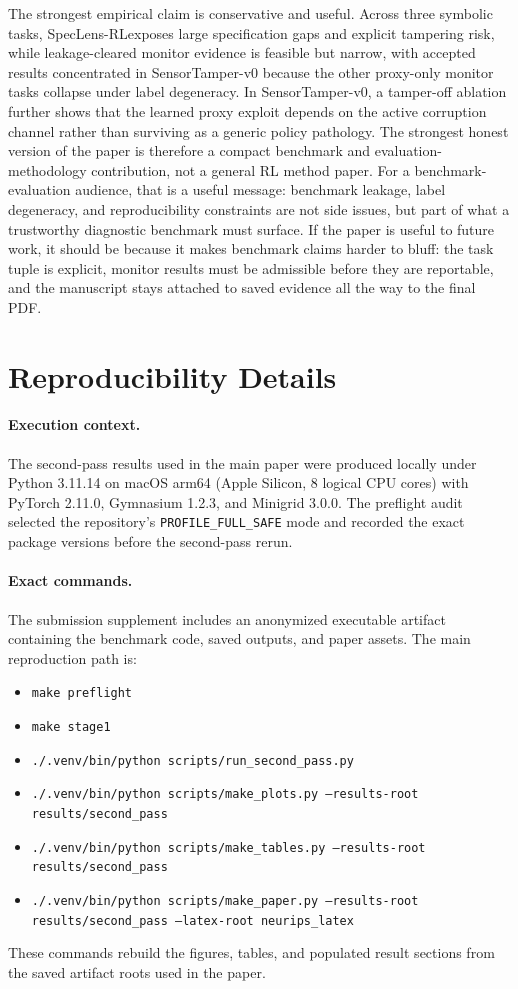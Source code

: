 \documentclass{article}
\newcommand{\framework}{SpecLens-RL}
\begin{document}
The strongest empirical claim is conservative and useful. Across three symbolic
tasks, \framework exposes large specification gaps and explicit tampering risk,
while leakage-cleared monitor evidence is feasible but narrow, with accepted
results concentrated in SensorTamper-v0 because the other proxy-only monitor
tasks collapse under label degeneracy. In SensorTamper-v0, a tamper-off
ablation further shows that the learned proxy exploit depends on the active
corruption channel rather than surviving as a generic policy pathology. The
strongest honest version of the paper is therefore a compact benchmark and
evaluation-methodology contribution, not a general RL method paper. For a
benchmark-evaluation audience, that is a useful message: benchmark leakage,
label degeneracy, and reproducibility constraints are not side issues, but part
of what a trustworthy diagnostic benchmark must surface. If the paper is useful
to future work, it should be because it makes benchmark claims harder to bluff:
the task tuple is explicit, monitor results must be admissible before they are
reportable, and the manuscript stays attached to saved evidence all the way to
the final PDF.



\appendix
\section{Reproducibility Details}
\paragraph{Execution context.}
The second-pass results used in the main paper were produced locally under
Python 3.11.14 on macOS arm64 (Apple Silicon, 8 logical CPU cores) with
PyTorch 2.11.0, Gymnasium 1.2.3, and Minigrid 3.0.0. The preflight audit
selected the repository's \texttt{PROFILE\_FULL\_SAFE} mode and recorded the
exact package versions before the second-pass rerun.

\paragraph{Exact commands.}
The submission supplement includes an anonymized executable artifact containing
the benchmark code, saved outputs, and paper assets. The main reproduction path
is:
\begin{itemize}
\item \texttt{make preflight}
\item \texttt{make stage1}
\item \texttt{./.venv/bin/python scripts/run\_second\_pass.py}
\item \texttt{./.venv/bin/python scripts/make\_plots.py --results-root results/second\_pass}
\item \texttt{./.venv/bin/python scripts/make\_tables.py --results-root results/second\_pass}
\item \texttt{./.venv/bin/python scripts/make\_paper.py --results-root results/second\_pass --latex-root neurips\_latex}
\end{itemize}
These commands rebuild the figures, tables, and populated result sections from
the saved artifact roots used in the paper.
\end{document}
